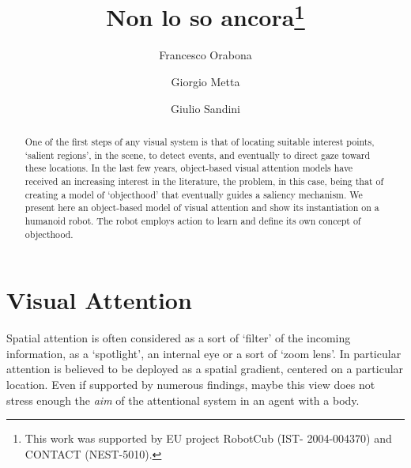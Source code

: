 \documentclass{llncs}
\makeatletter
\DeclareRobustCommand\onedot{\futurelet\@let@token\@onedot}
\def\@onedot{\ifx\@let@token.\else.\null\fi\xspace}
\def\etal{\emph{et al}\onedot}
\makeatother
\begin{document}
\mainmatter

\title{Non lo so ancora\thanks{This work was supported by EU project RobotCub (IST-
2004-004370) and CONTACT (NEST-5010).}}

\author{Francesco Orabona \and Giorgio Metta \and Giulio Sandini}


\maketitle

\begin{abstract}
One of the first
steps of any visual system is that of
locating suitable interest points, `salient regions', in
the scene, to detect events, and eventually to direct
gaze toward these locations. In the last few years,
object-based visual attention models have received an
increasing interest in the literature, the problem, in
this case, being that of creating a model of
`objecthood' that eventually guides a saliency
mechanism. We present here an object-based model of
visual attention and show its instantiation on a
humanoid robot. The robot employs action to learn
and define its own concept of objecthood.
\end{abstract}

\section{Visual Attention\label{attention}}

Spatial attention is often considered as a sort of `filter'
of the incoming information, as a `spotlight',
an internal eye or a sort of `zoom lens'. In particular attention is
believed to be deployed as a spatial gradient, centered on a particular location.
Even if supported by numerous findings, maybe this view does not
stress enough the \emph{aim} of the attentional system in an agent with a body.
\end{document}

